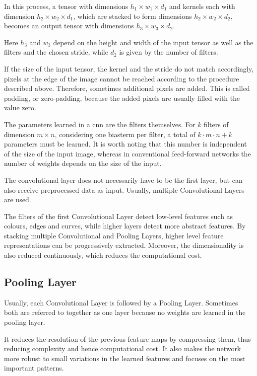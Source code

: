 In this process, a tensor with dimensions $h_1 \times w_1 \times d_1$ and kernels each with dimension $h_2 \times w_2 \times d_1$, which are stacked to form dimensions $h_2 \times w_2 \times d_2$, becomes an output tensor with dimensions $h_3 \times w_3 \times d_2$. \cite{Arunava:2018}

Here $h_3$ and $w_3$ depend on the height and width of the input tensor as well as the filters and the chosen stride, while $d_2$ is given by the number of filters.

If the size of the input tensor, the kernel and the stride do not match accordingly, pixels at the edge of the image cannot be reached according to the procedure described above. Therefore, sometimes additional pixels are added. This is called padding, or zero-padding, because the added pixels are usually filled with the value zero. \cite{Michelucci:2019}

The parameters learned in a \ac{cnn} are the filters themselves. For $k$ filters of dimension $m \times n$, considering one biasterm per filter, a total of $k \cdot m \cdot n + k$ parameters must be learned. It is worth noting that this number is independent of the size of the input image, whereas in conventional feed-forward networks the number of weights depends on the size of the input.\cite{Michelucci:2019}

The convolutional layer does not necessarily have to be the first layer, but can also receive preprocessed data as input. Usually, multiple Convolutional Layers are used.\cite{Michelucci:2019}

The filters of the first Convolutional Layer detect low-level features such as colours, edges and curves, while higher layers detect more abstract features. By stacking multiple Convolutional and Pooling Layers, higher level feature representations can be progressively extracted. Moreover, the dimensionality is also reduced continuously, which reduces the computational cost. \cite{Gu:2018} \cite{Saha:2018}

\subsection{Pooling Layer}%

Usually, each Convolutional Layer is followed by a Pooling Layer. Sometimes both are referred to together as one layer because no weights are learned in the pooling layer. \cite{Michelucci:2019}

It reduces the resolution of the previous feature maps by compressing them, thus reducing complexity and hence computational cost. It also makes the network more robust to small variations in the learned features and focuses on the most important patterns. \cite{Namatevs.2017}

